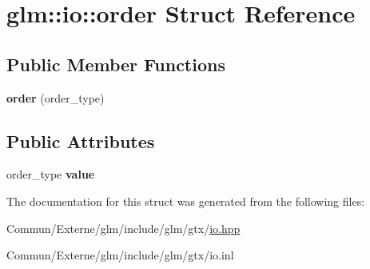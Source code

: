 \hypertarget{structglm_1_1io_1_1order}{}\section{glm\+:\+:io\+:\+:order Struct Reference}
\label{structglm_1_1io_1_1order}
\subsection*{Public Member Functions}
\begin{DoxyCompactItemize}
\item 
{\bfseries order} (order\+\_\+type)\hypertarget{structglm_1_1io_1_1order_a06813d404c975865fdd3a77146268a1f}{}\label{structglm_1_1io_1_1order_a06813d404c975865fdd3a77146268a1f}

\end{DoxyCompactItemize}
\subsection*{Public Attributes}
\begin{DoxyCompactItemize}
\item 
order\+\_\+type {\bfseries value}\hypertarget{structglm_1_1io_1_1order_aa8788dd0568bacd081d02bd5aca9889b}{}\label{structglm_1_1io_1_1order_aa8788dd0568bacd081d02bd5aca9889b}

\end{DoxyCompactItemize}


The documentation for this struct was generated from the following files\+:\begin{DoxyCompactItemize}
\item 
Commun/\+Externe/glm/include/glm/gtx/\hyperlink{io_8hpp}{io.\+hpp}\item 
Commun/\+Externe/glm/include/glm/gtx/io.\+inl\end{DoxyCompactItemize}
